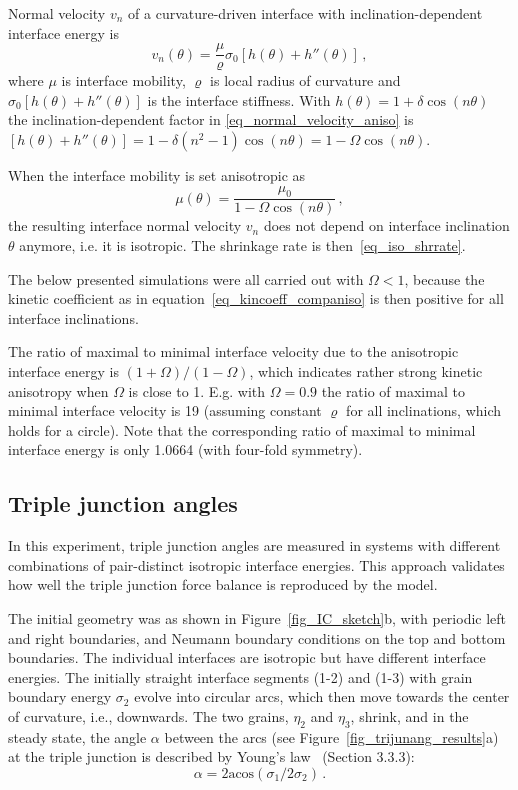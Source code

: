 Normal velocity $v_n$ of a curvature-driven interface with inclination-dependent interface energy is~\cite{Abdeljawad2018}
\begin{equation}\label{eq_normal_velocity_aniso}
	v_n(\theta) = \frac{\mu}{\varrho}  \sigma_0[h(\theta)+h''(\theta)]\,,
\end{equation}
where $\mu$ is interface mobility, $\varrho$ is local radius of curvature and $\sigma_0[h(\theta)+h''(\theta)]$ is the interface stiffness. With $h(\theta)=1+\delta\cos(n\theta)$ the inclination-dependent factor in \eqref{eq_normal_velocity_aniso} is $[h(\theta)+h''(\theta)] = 1 - \delta(n^2-1)\cos(n\theta) = 1-\Omega\cos(n\theta)$.

When the interface mobility is set anisotropic as
\begin{equation} \label{eq_kincoeff_companiso}
	\mu(\theta) = \frac{\mu_0}{1-\Omega\cos(n\theta)} \,,
\end{equation}
the resulting interface normal velocity $v_n$ does not depend on interface inclination $\theta$ anymore, i.e. it is isotropic. The shrinkage rate is then~\eqref{eq_iso_shrrate}.

The below presented simulations were all carried out with $\Omega<1$, because the kinetic coefficient as in equation~\eqref{eq_kincoeff_companiso} is then positive for all interface inclinations. 

The ratio of maximal to minimal interface velocity due to the anisotropic interface energy is $(1+\Omega)/(1-\Omega)$, which indicates rather strong kinetic anisotropy when $\Omega$ is close to 1. E.g. with $\Omega=0.9$ the ratio of maximal to minimal interface velocity is 19 (assuming constant $\varrho$ for all inclinations, which holds for a circle). Note that the corresponding ratio of maximal to minimal interface energy is only 1.0664 (with four-fold symmetry).

\subsection{Triple junction angles}

In this experiment, triple junction angles are measured in systems with different combinations of pair-distinct isotropic interface energies. This approach validates how well the triple junction force balance is reproduced by the model.

The initial geometry was as shown in Figure~\ref{fig_IC_sketch}b, with periodic left and right boundaries, and Neumann boundary conditions on the top and bottom boundaries. The individual interfaces are isotropic but have different interface energies. The initially straight interface segments (1-2) and (1-3) with grain boundary energy $\sigma_2$ evolve into circular arcs, which then move towards the center of curvature, i.e., downwards. The two grains, $\eta_2$ and $\eta_3$, shrink, and in the steady state, the angle $\alpha$ between the arcs (see Figure~\ref{fig_trijunang_results}a) at the triple junction is described by Young's law~\cite{Porter2009} (Section 3.3.3):
\begin{equation}
	\alpha = 2\mathrm{acos}(\sigma_{1}/2\sigma_{2}) \,.
\end{equation}

